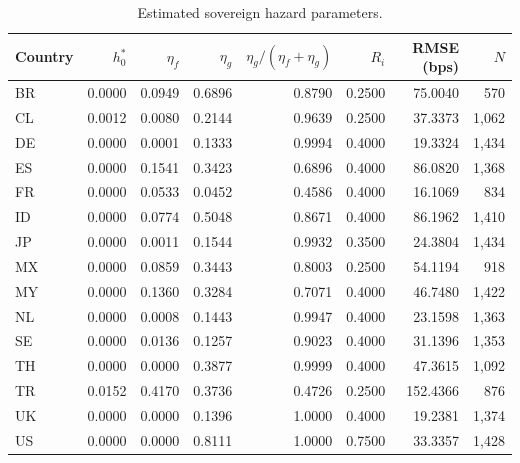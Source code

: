\begin{table}
\caption{Estimated sovereign hazard parameters.}
\label{tab:estimated_params}
\begin{tabular}{lrrrrrrr}
\toprule
Country & $h_0^*$ & $\eta_f$ & $\eta_g$ & $\eta_g/(\eta_f+\eta_g)$ & $R_i$ & RMSE (bps) & $N$ \\
\midrule
BR & 0.0000 & 0.0949 & 0.6896 & 0.8790 & 0.2500 & 75.0040 & 570 \\
CL & 0.0012 & 0.0080 & 0.2144 & 0.9639 & 0.2500 & 37.3373 & 1,062 \\
DE & 0.0000 & 0.0001 & 0.1333 & 0.9994 & 0.4000 & 19.3324 & 1,434 \\
ES & 0.0000 & 0.1541 & 0.3423 & 0.6896 & 0.4000 & 86.0820 & 1,368 \\
FR & 0.0000 & 0.0533 & 0.0452 & 0.4586 & 0.4000 & 16.1069 & 834 \\
ID & 0.0000 & 0.0774 & 0.5048 & 0.8671 & 0.4000 & 86.1962 & 1,410 \\
JP & 0.0000 & 0.0011 & 0.1544 & 0.9932 & 0.3500 & 24.3804 & 1,434 \\
MX & 0.0000 & 0.0859 & 0.3443 & 0.8003 & 0.2500 & 54.1194 & 918 \\
MY & 0.0000 & 0.1360 & 0.3284 & 0.7071 & 0.4000 & 46.7480 & 1,422 \\
NL & 0.0000 & 0.0008 & 0.1443 & 0.9947 & 0.4000 & 23.1598 & 1,363 \\
SE & 0.0000 & 0.0136 & 0.1257 & 0.9023 & 0.4000 & 31.1396 & 1,353 \\
TH & 0.0000 & 0.0000 & 0.3877 & 0.9999 & 0.4000 & 47.3615 & 1,092 \\
TR & 0.0152 & 0.4170 & 0.3736 & 0.4726 & 0.2500 & 152.4366 & 876 \\
UK & 0.0000 & 0.0000 & 0.1396 & 1.0000 & 0.4000 & 19.2381 & 1,374 \\
US & 0.0000 & 0.0000 & 0.8111 & 1.0000 & 0.7500 & 33.3357 & 1,428 \\
\bottomrule
\end{tabular}
\end{table}
